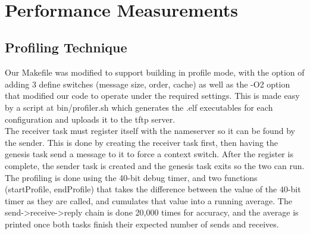 \documentclass[12pt]{article}
\begin{document}
\\[2\baselineskip]

\section{Performance Measurements}
\subsection{Profiling Technique}
Our Makefile was modified to support building in profile mode, with the option of adding 3 define switches (message size, order, cache) as well as the -O2 option that modified our code to operate under the required settings. This is made easy by a script at bin/profiler.sh which generates the .elf executables for each configuration and uploads it to the tftp server.
\\
The receiver task must register itself with the nameserver so it can be found by the sender. This is done by creating the receiver task first, then having the genesis task send a message to it to force a context switch. After the register is complete, the sender task is created and the genesis task exits so the two can run.
\\
The profiling is done using the 40-bit debug timer, and two functions (startProfile, endProfile) that takes the difference between the value of the 40-bit timer as they are called, and cumulates that value into a running average. The send->receive->reply chain is done 20,000 times for accuracy, and the average is printed once both tasks finish their expected number of sends and receives.
\end{document}
